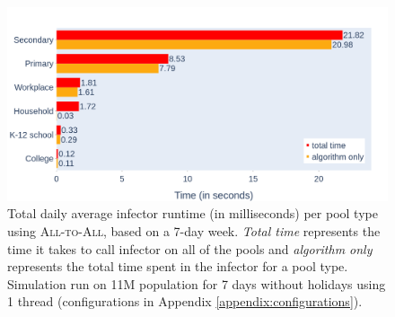 \begin{figure}
    \centering
    \includegraphics[width=\linewidth]{4 - Sampling/fig/standard/standard_times_type_totals.png}
    \caption{Total daily average infector runtime (in milliseconds) per pool type using \textsc{All-to-All}, based on a 7-day week. \textit{Total time} represents the time it takes to call infector on all of the pools and \textit{algorithm only} represents the total time spent in the infector for a pool type. Simulation run on 11M population for 7 days without holidays using 1 thread (configurations in Appendix \ref{appendix:configurations}).}
    \label{fig:standard_times_type_totals}
\end{figure}

